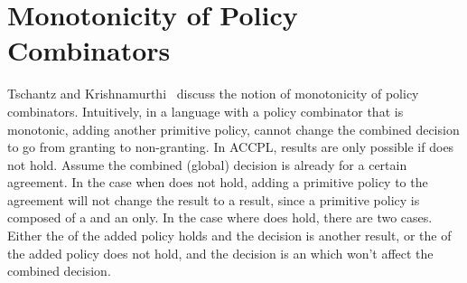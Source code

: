 \section{Monotonicity of Policy Combinators}

Tschantz and Krishnamurthi~\cite{Tschantz} discuss the notion of monotonicity of policy combinators. Intuitively, in a language with a policy combinator that is monotonic, adding another primitive policy, cannot change the combined decision to go from granting to non-granting. In \ac{ACCPL},  results are only possible if  does not hold. Assume the combined (global) decision is already  for a certain agreement. In the case when  does not hold, adding a primitive policy to the agreement will not change the  result to a  result, since a primitive policy is composed of a  and an  only. In the case where  does hold, there are two cases. Either the  of the added policy holds and the decision is another  result, or the  of the added policy does not hold, and the decision is an  which won't affect the combined decision.






